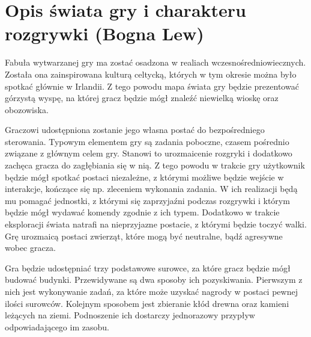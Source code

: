 \section{Opis świata gry i charakteru rozgrywki (Bogna Lew)}\label{s:swiat}
Fabuła wytwarzanej gry ma zostać osadzona w realiach wczesnośredniowiecznych. Została ona zainspirowana kulturą celtycką, których
w tym okresie można było spotkać głównie w Irlandii. Z tego powodu mapa świata gry będzie prezentować górzystą wyspę, na
której gracz będzie mógł znaleźć niewielką wioskę oraz obozowiska.

Graczowi udostępniona zostanie jego własna postać do bezpośredniego sterowania. Typowym elementem gry są zadania
poboczne, czasem pośrednio związane z głównym celem gry. Stanowi to urozmaicenie rozgryki i dodatkowo zachęca gracza do
zagłębiania się w nią. Z tego powodu w trakcie gry użytkownik będzie mógł spotkać postaci niezależne, z którymi możliwe
będzie wejście w interakcje, kończące się np. zleceniem wykonania zadania. W ich realizacji będą mu pomagać jednostki,
z którymi się zaprzyjaźni podczas rozgrywki i którym będzie mógł wydawać komendy zgodnie z ich typem. Dodatkowo w
trakcie eksploracji świata natrafi na nieprzyjazne postacie, z którymi będzie toczyć walki. Grę urozmaicą postaci
zwierząt, które mogą być neutralne, bądź agresywne wobec gracza.

Gra będzie udostępniać trzy podstawowe surowce, za które gracz będzie mógł budować budynki. Przewidywane są dwa sposoby
ich pozyskiwania. Pierwszym z nich jest wykonywanie zadań, za które może uzyskać nagrody w postaci pewnej ilości
surowców. Kolejnym sposobem jest zbieranie kłód drewna oraz kamieni leżących na ziemi. Podnoszenie ich dostarczy
jednorazowy przypływ odpowiadającego im zasobu.
